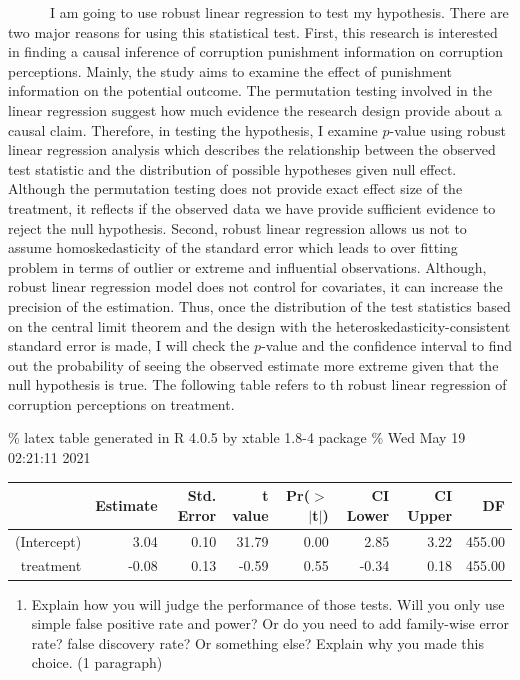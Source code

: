 \documentclass[
  11pt,
]{article}
\providecommand{\tightlist}{%
  \setlength{\itemsep}{0pt}\setlength{\parskip}{0pt}}
\begin{document}
~~~~~~I am going to use robust linear regression to test my hypothesis.
There are two major reasons for using this statistical test. First, this
research is interested in finding a causal inference of corruption
punishment information on corruption perceptions. Mainly, the study aims
to examine the effect of punishment information on the potential
outcome. The permutation testing involved in the linear regression
suggest how much evidence the research design provide about a causal
claim. Therefore, in testing the hypothesis, I examine \(p\)-value using
robust linear regression analysis which describes the relationship
between the observed test statistic and the distribution of possible
hypotheses given null effect. Although the permutation testing does not
provide exact effect size of the treatment, it reflects if the observed
data we have provide sufficient evidence to reject the null hypothesis.
Second, robust linear regression allows us not to assume
homoskedasticity of the standard error which leads to over fitting
problem in terms of outlier or extreme and influential observations.
Although, robust linear regression model does not control for
covariates, it can increase the precision of the estimation. Thus, once
the distribution of the test statistics based on the central limit
theorem and the design with the heteroskedasticity-consistent standard
error is made, I will check the \(p\)-value and the confidence interval
to find out the probability of seeing the observed estimate more extreme
given that the null hypothesis is true. The following table refers to th
robust linear regression of corruption perceptions on treatment.

\% latex table generated in R 4.0.5 by xtable 1.8-4 package \% Wed May
19 02:21:11 2021

\begin{table}[ht]
\centering
\begin{tabular}{rrrrrrrr}
  \hline
 & Estimate & Std. Error & t value & Pr($>$$|$t$|$) & CI Lower & CI Upper & DF \\ 
  \hline
(Intercept) & 3.04 & 0.10 & 31.79 & 0.00 & 2.85 & 3.22 & 455.00 \\ 
  treatment & -0.08 & 0.13 & -0.59 & 0.55 & -0.34 & 0.18 & 455.00 \\ 
   \hline
\end{tabular}
\label{tab:lm_robust Regression}
\end{table}

\begin{enumerate}
\def\labelenumi{\arabic{enumi}.}
\setcounter{enumi}{8}
\tightlist
\item
  Explain how you will judge the performance of those tests. Will you
  only use simple false positive rate and power? Or do you need to add
  family-wise error rate? false discovery rate? Or something else?
  Explain why you made this choice. (1 paragraph)
\end{enumerate}
\end{document}
